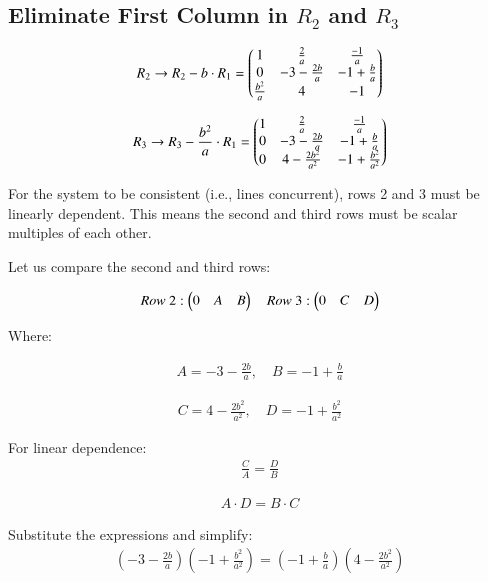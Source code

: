 \documentclass{article}
\begin{document}
\subsection*{Eliminate First Column in $R_2$ and $R_3$}

\begin{align}
R_2 \rightarrow R_2 - b \cdot R_1 = 
\begin{pmatrix}
1 & \frac{2}{a} & \frac{-1}{a} \\
0 & -3 - \frac{2b}{a} & -1 + \frac{b}{a} \\
\frac{b^2}{a} & 4 & -1
\end{pmatrix}
\end{align}

\begin{align}
R_3 \rightarrow R_3 - \frac{b^2}{a} \cdot R_1 = 
\begin{pmatrix}
1 & \frac{2}{a} & \frac{-1}{a} \\
0 & -3 - \frac{2b}{a} & -1 + \frac{b}{a} \\
0 & 4 - \frac{2b^2}{a^2} & -1 + \frac{b^2}{a^2}
\end{pmatrix}
\end{align}

For the system to be consistent (i.e., lines concurrent), rows 2 and 3 must be linearly dependent. This means the second and third rows must be scalar multiples of each other.

Let us compare the second and third rows:

\begin{align}
Row\ 2: \begin{pmatrix}0 \quad A \quad B\end{pmatrix} \quad
Row\ 3: \begin{pmatrix}0 \quad C \quad D\end{pmatrix}
\end{align}

Where:

\begin{align}
A = -3 - \frac{2b}{a}, \quad B = -1 + \frac{b}{a}
\end{align}

\begin{align}
C = 4 - \frac{2b^2}{a^2}, \quad D = -1 + \frac{b^2}{a^2}
\end{align}

For linear dependence:
\begin{align}
\frac{C}{A} = \frac{D}{B}
\end{align}

\begin{align}
A \cdot D = B \cdot C
\end{align}

Substitute the expressions and simplify:
\begin{align}
(-3 - \frac{2b}{a})(-1 + \frac{b^2}{a^2}) = 
(-1 + \frac{b}{a})(4 - \frac{2b^2}{a^2})
\end{align}
\end{document}
